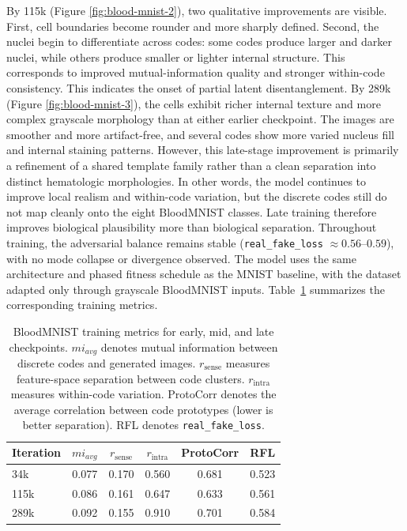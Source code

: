 \documentclass[letterpaper]{article} %
\begin{document}
	By 115k (Figure \ref{fig:blood-mnist-2}), two qualitative improvements are visible. First, cell boundaries become rounder and more sharply defined. Second, the nuclei begin to differentiate across codes: some codes produce larger and darker nuclei, while others produce smaller or lighter internal structure. This corresponds to improved mutual-information quality and stronger within-code consistency. This indicates the onset of partial latent disentanglement.
	By 289k (Figure \ref{fig:blood-mnist-3}), the cells exhibit richer internal texture and more complex grayscale morphology than at either earlier checkpoint. The images are smoother and more artifact-free, and several codes show more varied nucleus fill and internal staining patterns. However, this late-stage improvement is primarily a refinement of a shared template family rather than a clean separation into distinct hematologic morphologies. In other words, the model continues to improve local realism and within-code variation, but the discrete codes still do not map cleanly onto the eight BloodMNIST classes. Late training therefore improves biological plausibility more than biological separation.
	Throughout training, the adversarial balance remains stable (\texttt{real\_fake\_loss} $\approx 0.56$--$0.59$), with no mode collapse or divergence observed. The model uses the same architecture and phased fitness schedule as the MNIST baseline, with the dataset adapted only through grayscale BloodMNIST inputs. Table~\ref{tab:blood_metrics} summarizes the corresponding training metrics.
	
	\begin{table}[b]
		\centering
		\caption{BloodMNIST training metrics for early, mid, and late checkpoints. $mi_{avg}$ denotes mutual information between discrete codes and generated images. $r_{\text{sense}}$ measures feature-space separation between code clusters. $r_{\text{intra}}$ measures within-code variation. ProtoCorr denotes the average correlation between code prototypes (lower is better separation). RFL denotes \texttt{real\_fake\_loss}.}
		\label{tab:blood_metrics}
		\begin{tabular}{lccccc}
			\toprule
			Iteration & $mi_{avg}$ & $r_{\text{sense}}$ & $r_{\text{intra}}$ & ProtoCorr & RFL \\
			\midrule
			34k  & 0.077 & 0.170 & 0.560 & 0.681 & 0.523 \\
			115k & 0.086 & 0.161 & 0.647 & 0.633 & 0.561 \\
			289k & 0.092 & 0.155 & 0.910 & 0.701 & 0.584 \\
			\bottomrule
		\end{tabular}
	\end{table}
	
\end{document}
